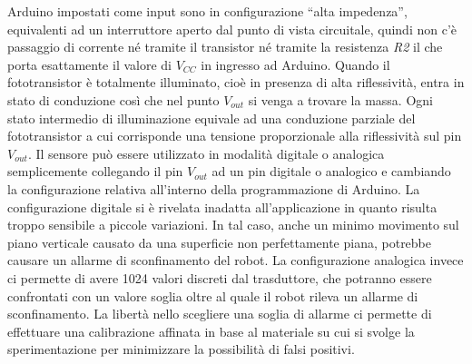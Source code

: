 Arduino impostati come input sono in configurazione ``alta impedenza'', 
equivalenti ad un interruttore aperto dal punto di vista circuitale, quindi 
non c'è passaggio di corrente né tramite il transistor né tramite la 
resistenza \textit{R2} il che porta esattamente il valore di $V_{CC}$ in 
ingresso ad Arduino. Quando il fototransistor è totalmente illuminato, cioè in 
presenza di alta riflessività, entra in stato di conduzione così che nel punto 
$V_{out}$ si venga a trovare la massa. Ogni stato intermedio di illuminazione 
equivale ad una conduzione parziale del fototransistor a cui corrisponde una 
tensione proporzionale alla riflessività sul pin $V_{out}$. Il sensore può 
essere utilizzato in modalità digitale o analogica semplicemente collegando il 
pin $V_{out}$ ad un pin digitale o analogico e cambiando la configurazione 
relativa all'interno della programmazione di Arduino. La configurazione 
digitale si è rivelata inadatta all'applicazione in quanto risulta troppo sensibile a piccole variazioni. 
In tal caso, anche un minimo movimento sul piano verticale causato da una superficie non perfettamente piana, 
potrebbe causare un allarme di sconfinamento del robot. La configurazione 
analogica invece ci permette di avere 1024 valori discreti dal 
trasduttore, che potranno essere confrontati con un valore soglia oltre al 
quale il robot rileva un allarme di sconfinamento. La libertà nello scegliere 
una soglia di allarme ci permette di effettuare una calibrazione affinata in 
base al materiale su cui si svolge la sperimentazione per minimizzare la possibilità di 
falsi positivi. 
